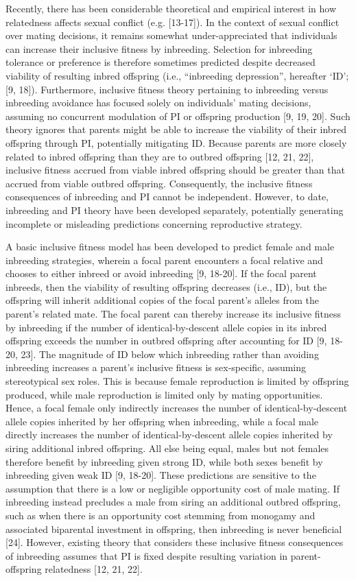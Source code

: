 \documentclass[12pt]{article}
\begin{document}
Recently, there has been considerable theoretical and empirical interest in how relatedness affects sexual conflict (e.g. [13-17]). In the context of sexual conflict over mating decisions, it remains somewhat under-appreciated that individuals can increase their inclusive fitness by inbreeding. Selection for inbreeding tolerance or preference is therefore sometimes predicted despite decreased viability of resulting inbred offspring (i.e., ``inbreeding depression'', hereafter `ID'; [9, 18]). Furthermore, inclusive fitness theory pertaining to inbreeding versus inbreeding avoidance has focused solely on individuals' mating decisions, assuming no concurrent modulation of PI or offspring production [9, 19, 20]. Such theory ignores that parents might be able to increase the viability of their inbred offspring through PI, potentially mitigating ID. Because parents are more closely related to inbred offspring than they are to outbred offspring [12, 21, 22], inclusive fitness accrued from viable inbred offspring should be greater than that accrued from viable outbred offspring. Consequently, the inclusive fitness consequences of inbreeding and PI cannot be independent. However, to date, inbreeding and PI theory have been developed separately, potentially generating incomplete or misleading predictions concerning reproductive strategy.

A basic inclusive fitness model has been developed to predict female and male inbreeding strategies, wherein a focal parent encounters a focal relative and chooses to either inbreed or avoid inbreeding [9, 18-20]. If the focal parent inbreeds, then the viability of resulting offspring decreases (i.e., ID), but the offspring will inherit additional copies of the focal parent's alleles from the parent's related mate. The focal parent can thereby increase its inclusive fitness by inbreeding if the number of identical-by-descent allele copies in its inbred offspring exceeds the number in outbred offspring after accounting for ID [9, 18-20, 23]. The magnitude of ID below which inbreeding rather than avoiding inbreeding increases a parent's inclusive fitness is sex-specific, assuming stereotypical sex roles. This is because female reproduction is limited by offspring produced, while male reproduction is limited only by mating opportunities. Hence, a focal female only indirectly increases the number of identical-by-descent allele copies inherited by her offspring when inbreeding, while a focal male directly increases the number of identical-by-descent allele copies inherited by siring additional inbred offspring. All else being equal, males but not females therefore benefit by inbreeding given strong ID, while both sexes benefit by inbreeding given weak ID [9, 18-20]. These predictions are sensitive to the assumption that there is a low or negligible opportunity cost of male mating. If inbreeding instead precludes a male from siring an additional outbred offspring, such as when there is an opportunity cost stemming from monogamy and associated biparental investment in offspring, then inbreeding is never beneficial [24]. However, existing theory that considers these inclusive fitness consequences of inbreeding assumes that PI is fixed despite resulting variation in parent-offspring relatedness [12, 21, 22]. 
\end{document}
